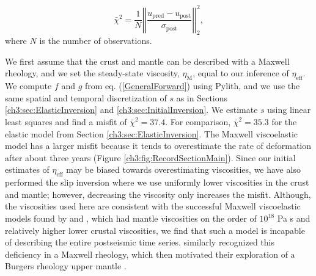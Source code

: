 \begin{equation}\label{ch3:eq:Misfit}
  \bar\chi^2 = \frac{1}{N}\left|\left|\frac{u_\mathrm{pred} - u_\mathrm{post}}{\sigma_\mathrm{post}}\right|\right|_2^2,
\end{equation}
where $N$ is the number of observations.

We first assume that the crust and mantle can be described with a Maxwell rheology, and we set the steady-state viscosity, $\eta_\mathrm{M}$, equal to our inference of $\eta_{\mathrm{eff}}$.  We compute $f$ and $g$ from eq. (\ref{GeneralForward}) using Pylith, and we use the same spatial and temporal discretization of $s$ as in Sections \ref{ch3:sec:ElasticInversion} and \ref{ch3:sec:InitialInversion}. We estimate $s$ using linear least squares and find a misfit of $\bar\chi^2=37.4$. For comparison, $\bar\chi^2=35.3$ for the elastic model from Section \ref{ch3:sec:ElasticInversion}.  The Maxwell viscoelastic model has a larger misfit because it tends to overestimate the rate of deformation after about three years (Figure \ref{ch3:fig:RecordSectionMain}). Since our initial estimates of $\eta_\mathrm{eff}$ may be biased towards overestimating viscosities, we have also performed the slip inversion where we use uniformly lower viscosities in the crust and mantle; however, decreasing the viscosity only increases the misfit.  Although, the viscosities used here are consistent with the successful Maxwell viscoelastic models found by \citet{Rollins2015} and \citet{Spinler2015}, which had mantle viscosities on the order of $10^{18}$ Pa s and relatively higher lower crustal viscosities, we find that such a model is incapable of describing the entire postseismic time series.  \citet{Pollitz2001} similarly recognized this deficiency in a Maxwell rheology, which then motivated their exploration of a Burgers rheology upper mantle \citep{Pollitz2003}.  

